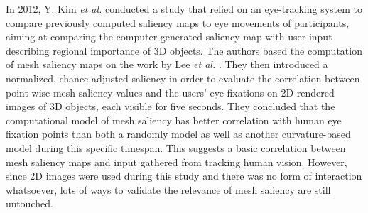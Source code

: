 In 2012, Y. Kim \textit{et al.} \cite{chen2012schelling} conducted a study that relied on an eye-tracking system to compare previously computed saliency maps to eye movements of participants, aiming at comparing the computer generated saliency map with user input describing regional importance of 3D objects. The authors based the computation of mesh saliency maps on the work by Lee \textit{et al.} \cite{lee2005mesh}. They then introduced a normalized, chance-adjusted saliency in order to evaluate the correlation between point-wise mesh saliency values and the users' eye fixations on 2D rendered images of 3D objects, each visible for five seconds. They concluded that the computational model of mesh saliency has better correlation with human eye fixation points than both a randomly model as well as another curvature-based model during this specific timespan. This suggests a basic correlation between mesh saliency maps and input gathered from tracking human vision. However, since 2D images were used during this study and there was no form of interaction whatsoever, lots of ways to validate the relevance of mesh saliency are still untouched.
